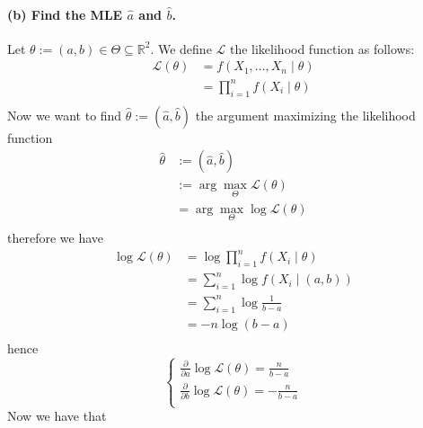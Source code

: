 \documentclass{article}
\newcommand{\R}{\mathbb{R}}
\renewcommand{\L}{\mathcal{L}}
\begin{document}
\paragraph{(b) Find the MLE $\hat{a}$ and $\hat{b}$.\\}
Let \(\theta := \left(a,b\right) \in \Theta \subseteq \R^2\). We define \(\L\) the likelihood function as follows:
\begin{align*}
    \L (\theta)
     & = f(X_1, \ldots, X_n \mid \theta)  \\
     & = \prod_{i=1}^n f(X_i \mid \theta) \\
\end{align*}
Now we want to find \(\hat\theta := (\hat a, \hat b)\) the argument maximizing the likelihood function
\begin{align*}
    \hat\theta
     & := (\hat a, \hat b)                \\
     & := \arg \max_\Theta \L(\theta)     \\
     & = \arg \max_\Theta \log \L(\theta) \\
\end{align*}
therefore we have
\begin{align*}
    \log \L(\theta)
     & = \log \prod_{i=1}^n f(X_i \mid \theta) \\
     & = \sum_{i=1}^n \log f(X_i \mid (a,b))   \\
     & = \sum_{i=1}^n \log \frac{1}{b-a}       \\
     & = -n \log (b-a)                         \\
\end{align*}
hence
\begin{equation*}
    \begin{cases}
        \frac{\partial}{\partial a} \log \L (\theta) = \frac{n}{b-a}  \\
        \frac{\partial}{\partial b} \log \L (\theta) = -\frac{n}{b-a} \\
    \end{cases}
\end{equation*}
Now we have that
\end{document}
